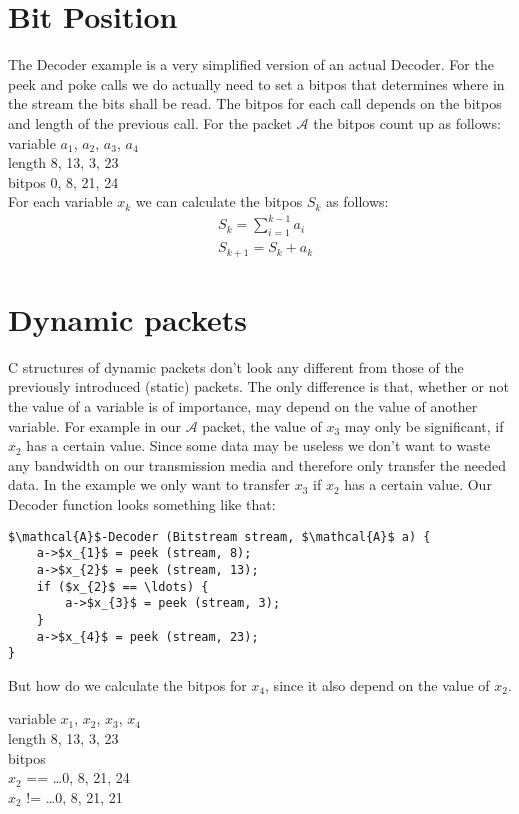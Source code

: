 \documentclass[parskip=full,paper=a4,DIV=12]{scrartcl}
\begin{document}
\section{Bit Position}

The Decoder example is a very simplified version of an actual Decoder.
For the peek and poke calls we do actually need to set a bitpos
that determines where in the stream the bits shall be read.
The bitpos for each call depends on the bitpos and length of the previous call.
For the packet $\mathcal{A}$ the bitpos count up as follows:\\
variable   $a_{1}$, $a_{2}$, $a_{3}$, $a_{4}$\\
length      8, 13,  3, 23\\
bitpos      0,  8, 21, 24\\
For each variable $x_{k}$ we can calculate the bitpos $S_{k}$ as follows:
\begin{align*}
	&S_{k} = \sum_{i=1}^{k-1} a_{i}\\
	&S_{k+1} = S_{k} + a_{k}
\end{align*}

\section{Dynamic packets}

C structures of dynamic packets don't look any different from those of the previously introduced (static) packets.
The only difference is that, whether or not the value of a variable is of importance, may depend on the value of another variable.	
For example in our $\mathcal{A}$ packet, the value of $x_{3}$ may only be significant, if $x_{2}$ has a certain value.
Since some data may be useless we don't want to waste any bandwidth on our transmission media and therefore only transfer the needed data.
In the example we only want to transfer $x_{3}$ if $x_{2}$ has a certain value.
Our Decoder function looks something like that:

\begin{lstlisting}[mathescape]
$\mathcal{A}$-Decoder (Bitstream stream, $\mathcal{A}$ a) {
	a->$x_{1}$ = peek (stream, 8);
	a->$x_{2}$ = peek (stream, 13);
	if ($x_{2}$ == \ldots) {
		a->$x_{3}$ = peek (stream, 3);
	}
	a->$x_{4}$ = peek (stream, 23);
}
\end{lstlisting}

But how do we calculate the bitpos for $x_{4}$, since it also depend on the value of $x_{2}$.

variable   $x_{1}$, $x_{2}$, $x_{3}$, $x_{4}$\\
length        8, 13, 3, 23\\
bitpos\\
$x_{2}$ == \ldots  0, 8, 21, 24\\
$x_{2}$ != \ldots  0, 8, 21, 21\\
\end{document}

